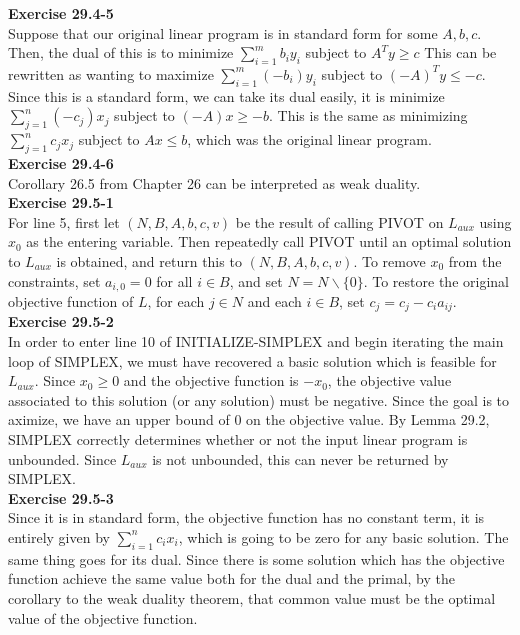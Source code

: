 \documentclass{article}
\begin{document}
\noindent\textbf{Exercise 29.4-5}\\

Suppose that our original linear program is in standard form for some $A,b,c$. Then, the dual of this is to minimize $\sum_{i=1}^m b_i y_i$ subject to $A^T y \ge c$ This can be rewritten as wanting to maximize $\sum_{i=1}^m (-b_i) y_i$ subject to $(-A)^T y \le -c$. Since this is a standard form, we can take its dual easily, it is minimize $\sum_{j=1}^n (-c_j) x_j$ subject to $(-A)x \ge -b$. This is the same as minimizing $\sum_{j=1}^n c_j x_j$ subject to $Ax \le b$, which was the original linear program.\\

\noindent\textbf{Exercise 29.4-6}\\

Corollary 26.5 from Chapter 26 can be interpreted as weak duality. \\

\noindent\textbf{Exercise 29.5-1}\\

For line 5, first let $(N,B,A,b,c,v)$ be the result of calling PIVOT on $L_{aux}$ using $x_0$ as the entering variable.  Then repeatedly call PIVOT until an optimal solution to $L_{aux}$ is obtained, and return this to $(N,B,A,b,c,v)$.  To remove $x_0$ from the constraints, set $a_{i,0} = 0$ for all $i \in B$, and set $N = N \backslash \{0\}$.  To restore the original objective function of $L$, for each $j \in N$ and each $i \in B$, set $c_j = c_j - c_ia_{ij}$. \\

\noindent\textbf{Exercise 29.5-2}\\

In order to enter line 10 of INITIALIZE-SIMPLEX and begin iterating the main loop of SIMPLEX, we must have recovered a basic solution which is feasible for $L_{aux}$. Since $x_0 \geq 0$ and the objective function is $-x_0$, the objective value associated to this solution (or any solution) must be negative. Since the goal is to aximize, we have an upper bound of 0 on the objective value. By Lemma 29.2, SIMPLEX correctly determines whether or not the input linear program is unbounded.  Since $L_{aux}$ is not unbounded, this can never be returned by SIMPLEX. \\

\noindent\textbf{Exercise 29.5-3}\\

Since it is in standard form, the objective function has no constant term, it is entirely given by $\sum_{i=1}^n c_i x_i$, which is going to be zero for any basic solution. The same thing goes for its dual. Since there is some solution which has the objective function achieve the same value both for the dual and the primal, by the corollary to the weak duality theorem, that common value must be the optimal value of the objective function.\\
\end{document}
